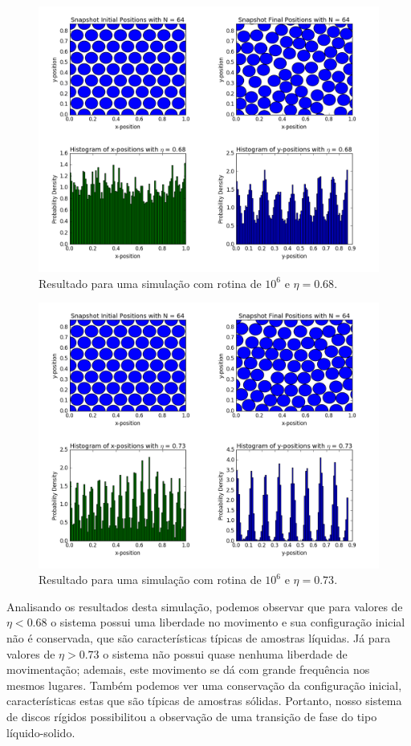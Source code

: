 \documentclass[%
reprint,
amsmath,amssymb,
aps,
12pt
]{revtex4-1}
\begin{document}
\begin{figure}[!h]
	\centering
	\includegraphics[scale=0.3]{md068.png}
	\caption{Resultado para uma simulação com rotina de $ 10^6 $ e $ \eta = 0.68 $.
		\label{md068}}
\end{figure}
\clearpage
\begin{figure}[!h]
	\centering
	\includegraphics[scale=0.3]{md073.png}
	\caption{Resultado para uma simulação com rotina de $ 10^6 $ e $ \eta = 0.73 $.
		\label{md073}}
\end{figure}


Analisando os resultados desta simulação, podemos observar que para valores de $ \eta < 0.68$ o sistema possui uma liberdade no movimento e sua configuração inicial não é conservada, que são características típicas de amostras líquidas. Já para valores de $ \eta > 0.73 $ o sistema não possui quase nenhuma liberdade de movimentação; ademais, este movimento se dá com grande frequência nos mesmos lugares. Também podemos ver uma conservação da configuração inicial, características estas que são típicas de amostras sólidas. Portanto, nosso sistema de discos rígidos possibilitou a observação de uma transição de fase do tipo líquido-solido.
\end{document}
